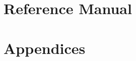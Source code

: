 \documentclass[a4paper,onecolumn,10pt]{book}
\begin{document}
\part{Reference Manual}








\part{Appendices}
\appendix





\printindex
\end{document}
